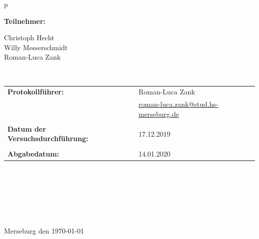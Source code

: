 \begin{center}
\begin{tabular}{p{\textwidth}}
\begin{center}
\Large{\textbf{Teilnehmer:}} \\ 
\end{center}
\begin{center}
\large{Christoph Hecht \\
	Willy Messerschmidt \\
	Roman-Luca Zank} \\
\end{center}


\\

\begin{center}
\begin{tabular}{lll}
\large{\textbf{Protokollführer:}} & & \large{Roman-Luca Zank} \\
& & \href{mailto:roman-luca.zank@stud.hs-merseburg.de}{{\footnotesize roman-luca.zank@stud.hs-merseburg.de}}\\
&&\\
\large{\textbf{Datum der Versuchsdurchführung:}}&& \large{17.12.2019}\\
&&\\
\large{\textbf{Abgabedatum:}}&& \large{14.01.2020}
\end{tabular}
\end{center}

\\ \\ \\ \\ \\ \\ 
\large{Merseburg den \today}

\end{tabular}
\end{center}
